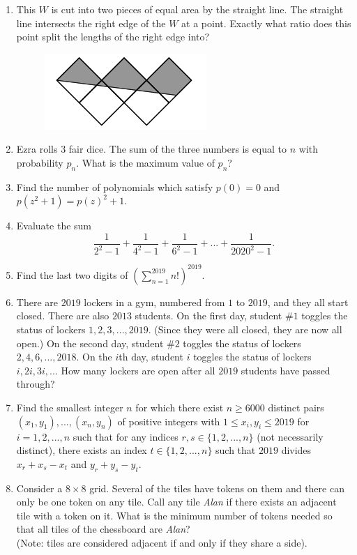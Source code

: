 \documentclass[12pt,titlepage]{article}
\begin{document}
\begin{enumerate}
    \item This $W$ is cut into two pieces of equal area by the straight line. The straight line intersects the right edge of the $W$ at a point. Exactly what ratio does this point split the lengths of the right edge into? 
    \begin{figure}[h]
    	\centering
    	\includegraphics[scale = 1]{type2_1.png}
    \end{figure}
    \item Ezra rolls $3$ fair dice. The sum of the three numbers is equal to $n$ with probability $p_n$. What is the maximum value of $p_n$?

    \item Find the number of polynomials which satisfy $p(0) = 0$ and $p(z^2 + 1) = p(z)^2 + 1$. 

    \item Evaluate the sum
    \[
    	\frac{1}{2^2 - 1} + \frac{1}{4^2 -1} + \frac{1}{6^2-1} + ... + \frac{1}{2020^2 - 1}. 
    \]

    \item Find the last two digits of $\displaystyle \left ( \sum_{n = 1}^{2019} n! \right )^{2019}$. 

    \item There are $2019$ lockers in a gym, numbered from $1$ to $2019$, and they all start closed. There are also $2013$ students. On the first day, student $\# 1$ toggles the status of lockers $1, 2, 3, ..., 2019$. (Since they were all closed, they are now all open.) On the second day, student $\# 2$ toggles the status of lockers $2, 4, 6, ..., 2018$. On the $i$th day, student $i$ toggles the status of lockers $i, 2i, 3i, ...$ How many lockers are open after all $2019$ students have passed through?  

    \item Find the smallest integer $n$ for which there exist $n \geq 6000$ distinct pairs $(x_1, y_1), ..., (x_n, y_n)$ of positive integers with $1 \leq x_i, y_i \leq 2019$ for $i = 1, 2, ..., n$ such that for any indices $r, s \in \{1, 2, ..., n\}$ (not necessarily distinct), there exists an index $t \in \{1, 2, ..., n\}$ such that $2019$ divides $x_r + x_s - x_t$ and $y_r + y_s - y_t$. 

    \item Consider a $8 \times 8$ grid. Several of the tiles have tokens on them and there can only be one token on any tile. Call any tile \textit{Alan} if there exists an adjacent tile with a token on it. What is the minimum number of tokens needed so that all tiles of the chessboard are \textit{Alan}? \\
    (Note: tiles are considered adjacent if and only if they share a side). 
\end{enumerate}
\end{document}
